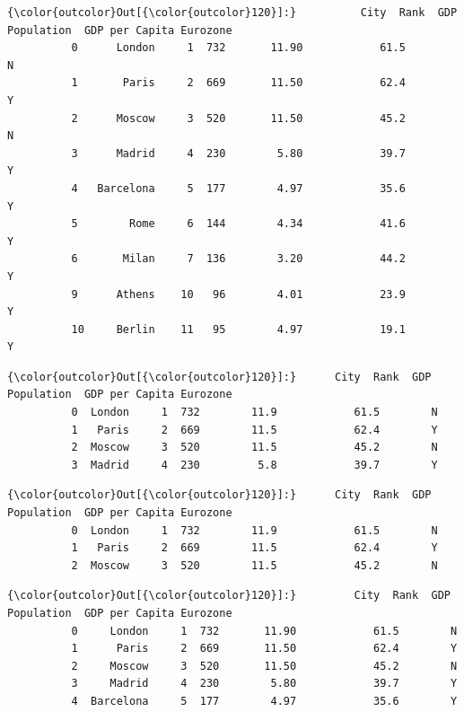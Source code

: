\documentclass[11pt]{article}
\begin{document}
\begin{Verbatim}[commandchars=\\\{\}]
{\color{outcolor}Out[{\color{outcolor}120}]:}          City  Rank  GDP  Population  GDP per Capita Eurozone
          0      London     1  732       11.90            61.5        N
          1       Paris     2  669       11.50            62.4        Y
          2      Moscow     3  520       11.50            45.2        N
          3      Madrid     4  230        5.80            39.7        Y
          4   Barcelona     5  177        4.97            35.6        Y
          5        Rome     6  144        4.34            41.6        Y
          6       Milan     7  136        3.20            44.2        Y
          9      Athens    10   96        4.01            23.9        Y
          10     Berlin    11   95        4.97            19.1        Y
\end{Verbatim}
            
\begin{Verbatim}[commandchars=\\\{\}]
{\color{outcolor}Out[{\color{outcolor}120}]:}      City  Rank  GDP  Population  GDP per Capita Eurozone
          0  London     1  732        11.9            61.5        N
          1   Paris     2  669        11.5            62.4        Y
          2  Moscow     3  520        11.5            45.2        N
          3  Madrid     4  230         5.8            39.7        Y
\end{Verbatim}
            
\begin{Verbatim}[commandchars=\\\{\}]
{\color{outcolor}Out[{\color{outcolor}120}]:}      City  Rank  GDP  Population  GDP per Capita Eurozone
          0  London     1  732        11.9            61.5        N
          1   Paris     2  669        11.5            62.4        Y
          2  Moscow     3  520        11.5            45.2        N
\end{Verbatim}
            
\begin{Verbatim}[commandchars=\\\{\}]
{\color{outcolor}Out[{\color{outcolor}120}]:}         City  Rank  GDP  Population  GDP per Capita Eurozone
          0     London     1  732       11.90            61.5        N
          1      Paris     2  669       11.50            62.4        Y
          2     Moscow     3  520       11.50            45.2        N
          3     Madrid     4  230        5.80            39.7        Y
          4  Barcelona     5  177        4.97            35.6        Y
\end{Verbatim}
            
\end{document}
